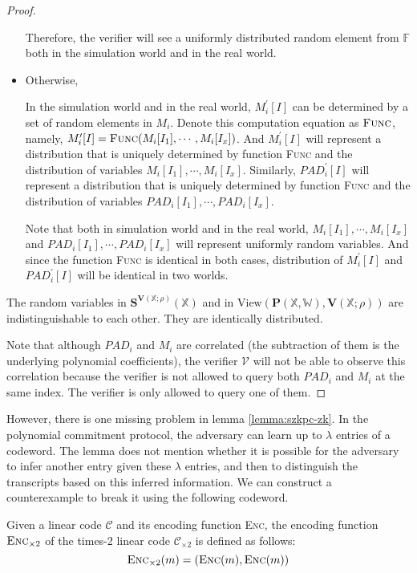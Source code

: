 \begin{proof}
\begin{itemize}
    Therefore, the verifier will see a uniformly distributed random element from $\mathbb{F}$ both in the simulation world and in the real world.
    
    \item Otherwise,
    
    In the simulation world and in the real world, $M_i^\prime[I]$ can be determined by a set of random elements in $M_i$. Denote this computation equation as $\textsc{Func}$, namely, $M_i^\prime[I] = \textsc{Func}(M_i[I_1], \cdots, M_i[I_x])$. And $M_i^\prime[I]$ will represent a distribution that is uniquely determined by function \textsc{Func} and the distribution of variables $M_i[I_1], \cdots, M_i[I_x]$. Similarly, $PAD_i^\prime[I]$ will represent a distribution that is uniquely determined by function \textsc{Func} and the distribution of variables $PAD_i[I_1], \cdots, PAD_i[I_x]$.
    
    Note that both in simulation world and in the real world, $M_i[I_1], \cdots, M_i[I_x]$ and $PAD_i[I_1], \cdots, PAD_i[I_x]$ will represent uniformly random variables. And since the function \textsc{Func} is identical in both cases, distribution of $M_i^\prime[I]$ and $PAD_i^\prime[I]$ will be identical in two worlds.
    
    
\end{itemize}

The random variables in $\textbf{S}^{\textbf{V}(\mathbb{X};\rho)}(\mathbb{X})$ and in $\text{View}(\textbf{P}(\mathbb{X}, \mathbb{W}), \textbf{V}(\mathbb{X};\rho))$ are indistinguishable to each other. They are identically distributed.

Note that although $PAD_i$ and $M_i$ are correlated (the subtraction of them is the underlying polynomial coefficients), the verifier $\mathcal{V}$ will not be able to observe this correlation because the verifier is not allowed to query both $PAD_i$ and $M_i$ at the same index. The verifier is only allowed to query one of them.

\end{proof}
However, there is one missing problem in lemma \ref{lemma:szkpc-zk}. In the polynomial commitment protocol, the adversary can learn up to $\lambda$ entries of a codeword.
The lemma does not mention whether it is possible for the adversary to infer another entry given these $\lambda$ entries, and then to distinguish the transcripts based on this inferred information. We can construct a counterexample to break it using the following codeword.

\begin{definition}
 Given a linear code $\mathcal{C}$ and its encoding function \textsc{Enc}, the encoding function $\textsc{Enc}_{\times 2}$ of the times-2 linear code $\mathcal{C}_{\times 2}$ is defined as follows:
 $$
    \textsc{Enc}_{\times 2} (m) = (\textsc{Enc}(m), \textsc{Enc}(m))
 $$
\end{definition}



